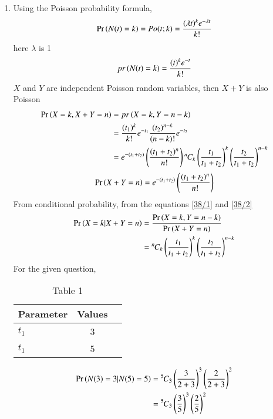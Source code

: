 \documentclass[journal,12pt,onecolumn]{IEEEtran}
\theoremstyle{remark}
\begin{document}
\begin{enumerate}[label=(\alph*)]
\item Using the Poisson probability formula,\\
 \begin{align}
 \Pr\left(N(t)=k\right) =Po(t;k) =\frac{(\lambda t)^k e^{-\lambda t}}{k!} 
  \end{align}
 here $\lambda$ is 1 
 \begin{align}
 pr\left(N(t)=k\right) = \frac{(t)^k e^{-t}}{k!}\\
 \end{align}
 $X$ and $Y$ are independent Poisson random variables, then $X+Y$ is also Poisson\\
 \begin{align}
 \Pr\left(X=k,X+Y=n\right)&=pr\left(X=k,Y=n-k\right)\\
 &=\frac{(t_1)^k}{k!}e^{-t_1}\frac{(t_2)^{n-k}}{(n-k)!}e^{-t_2}\\
 &=e^{-(t_1+t_2)}\left(\frac{(t_1+t_2)^n}{n!}\right){{}^{n}\mkern-1muC_{k}}\left(\frac{t_1}{t_1+t_2}\right)^k\left(\frac{t_2}{t_1+t_2}\right)^{n-k} \label{38/1}
 \end{align}
 \begin{align}
  \Pr\left(X+Y=n\right)=e^{-(t_1+t_2)}\left(\frac{(t_1+t_2)^n}{n!}\right)\label{38/2}
 \end{align}
  From conditional probability,
  from the equations \eqref{38/1} and \eqref{38/2}
 \begin{align}
 \Pr\left(X=k|X+Y=n\right)&=\frac{\Pr\left(X=k,Y=n-k\right)}{\Pr\left(X+Y=n\right)}\\
 &={{}^{n}\mkern-1muC_{k}}\left(\frac{t_1}{t_1+t_2}\right)^k\left(\frac{t_2}{t_1+t_2}\right)^{n-k}
 \end{align} 
 For the given question,
 \begin{table}[h!]
 \begin{center}
    \begin{tabular}{|l|c|r|}
    \hline
    Parameter & Values \\
    \hline
    $t_1$ &  3\\
    $t_1$&  5 \\
    \hline
    \end{tabular}
    \end{center}
    \caption{Table 1}
\end{table}
 \begin{align}
 \Pr\left(N(3)=3|N(5)=5\right)&={{}^{5}\mkern-1muC_{3}}\left(\frac{3}{2+3}\right)^3\left(\frac{2}{2+3}\right)^{2}\\
 &={{}^{5}\mkern-1muC_{3}}\left(\frac{3}{5}\right)^3\left(\frac{2}{5}\right)^{2}
 \end{align}

\end{enumerate}
\end{document}
